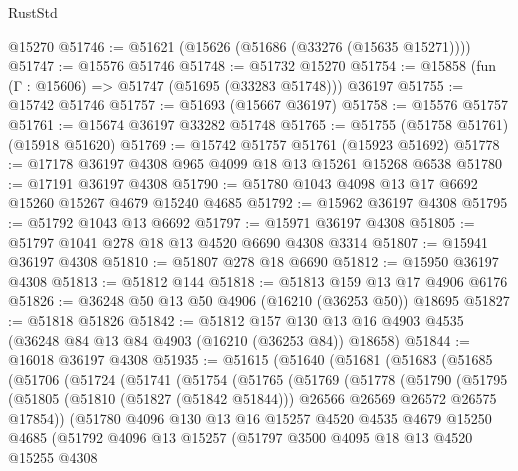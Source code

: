 \begin{lexlean}{RustStd}
\begin{coremodule}
    @15270
@51746 := @51621 (@15626 (@51686 (@33276 (@15635 @15271))))
@51747 := @15576 @51746
@51748 := @51732 @15270
@51754 := @15858 (fun (Γ : @15606) => @51747 (@51695 (@33283 @51748))) @36197
@51755 := @15742 @51746
@51757 := @51693 (@15667 @36197)
@51758 := @15576 @51757
@51761 := @15674 @36197 @33282 @51748
@51765 := @51755 (@51758 @51761) (@15918 @51620)
@51769 := @15742 @51757 @51761 (@15923 @51692)
@51778 := @17178 @36197 @4308 @965 @4099 @18 @13 @15261 @15268 @6538
@51780 := @17191 @36197 @4308
@51790 := @51780 @1043 @4098 @13 @17 @6692 @15260 @15267 @4679 @15240 @4685
@51792 := @15962 @36197 @4308
@51795 := @51792 @1043 @13 @6692
@51797 := @15971 @36197 @4308
@51805 := @51797 @1041 @278 @18 @13 @4520 @6690 @4308 @3314
@51807 := @15941 @36197 @4308
@51810 := @51807 @278 @18 @6690
@51812 := @15950 @36197 @4308
@51813 := @51812 @144
@51818 := @51813 @159 @13 @17 @4906 @6176
@51826 := @36248 @50 @13 @50 @4906 (@16210 (@36253 @50)) @18695
@51827 := @51818 @51826
@51842 := @51812
    @157
    @130
    @13
    @16
    @4903
    @4535
    (@36248 @84 @13 @84 @4903 (@16210 (@36253 @84)) @18658)
@51844 := @16018 @36197 @4308
@51935 := @51615
    (@51640
      (@51681
        (@51683
          (@51685
            (@51706
              (@51724
                (@51741
                  (@51754
                    (@51765
                      (@51769
                        (@51778
                          (@51790
                            (@51795
                              (@51805
                                (@51810 (@51827 (@51842 @51844)))
                                @26566
                                @26569
                                @26572
                                @26575
                                @17854))
                            (@51780
                              @4096
                              @130
                              @13
                              @16
                              @15257
                              @4520
                              @4535
                              @4679
                              @15250
                              @4685
                              (@51792
                                @4096
                                @13
                                @15257
                                (@51797
                                  @3500
                                  @4095
                                  @18
                                  @13
                                  @4520
                                  @15255
                                  @4308

\end{coremodule}
\end{lexlean}
